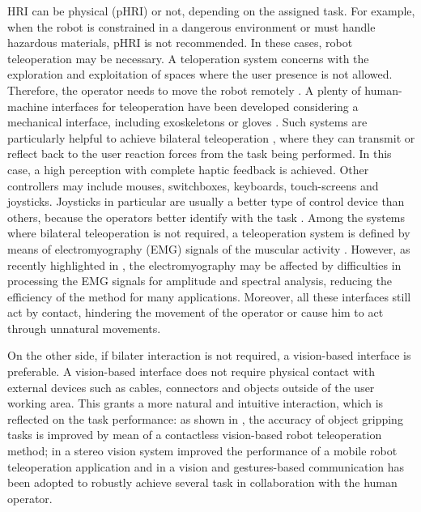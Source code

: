 \documentclass[a4paper, 10 pt, conference]{ieeeconf}      %
\begin{document}
HRI can be physical (pHRI) or not, depending on the assigned task. For example, when the robot is constrained in a dangerous environment or must handle hazardous materials, pHRI is not recommended. In these cases, robot teleoperation may be necessary. A teloperation system concerns with the exploration and exploitation of spaces where the user presence is not allowed. Therefore, the operator needs to move the robot remotely \cite{VERTUTJean}. A plenty of human-machine interfaces for teleoperation have been developed considering a mechanical interface, including exoskeletons \cite{Rebelo2014} or gloves \cite{Lv2006}. Such systems are particularly helpful to achieve bilateral teleoperation \cite{Hokayem2006}, where they can transmit or reflect back to the user reaction forces from the task being performed. In this case, a high perception with complete haptic feedback \cite{Glover2009} is achieved. Other controllers may include mouses, switchboxes, keyboards, touch-screens and joysticks. Joysticks in particular are usually a better type of control device than others, because the operators better identify with the task \cite{Boboc2012}. Among the systems where bilateral teleoperation is not required, a teleoperation system is defined by means of electromyography (EMG) signals of the muscular activity \cite{Vogel2011, Hassan2019}. However, as recently highlighted in \cite{Roveda2018a}, the electromyography may be affected by difficulties in processing the EMG signals for amplitude and spectral analysis, reducing the efficiency of the method for many applications. Moreover, all these interfaces still act by contact, hindering the movement of the operator or cause him to act through unnatural movements.

On the other side, if bilater interaction is not required, a vision-based interface is preferable. A vision-based interface does not require physical contact with external devices such as cables, connectors and objects outside of the user working area. This grants a more natural and intuitive interaction, which is reflected on the task performance: as shown in \cite{Kofman2005}, the accuracy of object gripping tasks is improved by mean of a contactless vision-based robot teleoperation method; in \cite{Livatino2009} a stereo vision system improved the performance of a mobile robot teleoperation application and in \cite{CollabWork} a vision and gestures-based communication has been adopted to robustly achieve several task in collaboration with the human operator. 
\end{document}
